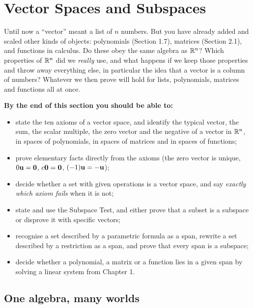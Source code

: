 \documentclass[11pt]{article}
\begin{document}
\section{Vector Spaces and Subspaces}

\begin{guide}
Until now a ``vector'' meant a list of $n$ numbers. But you have already added and scaled other kinds of objects: polynomials (Section 1.7), matrices (Section 2.1), and functions in calculus. Do these obey the same algebra as $\mathbb{R}^n$? Which properties of $\mathbb{R}^n$ did we \emph{really} use, and what happens if we keep those properties and throw away everything else, in particular the idea that a vector is a column of numbers? Whatever we then prove will hold for lists, polynomials, matrices and functions all at once.
\end{guide}

\textbf{By the end of this section you should be able to:}
\begin{itemize}
  \item state the ten axioms of a vector space, and identify the typical vector, the sum, the scalar multiple, the zero vector and the negative of a vector in $\mathbb{R}^n$, in spaces of polynomials, in spaces of matrices and in spaces of functions;
  \item prove elementary facts directly from the axioms (the zero vector is unique, $0\mathbf{u}=\mathbf{0}$, $c\mathbf{0}=\mathbf{0}$, $(-1)\mathbf{u}=-\mathbf{u}$);
  \item decide whether a set with given operations is a vector space, and say \emph{exactly which axiom fails} when it is not;
  \item state and use the Subspace Test, and either prove that a subset is a subspace or disprove it with specific vectors;
  \item recognise a set described by a parametric formula as a span, rewrite a set described by a restriction as a span, and prove that every span is a subspace;
  \item decide whether a polynomial, a matrix or a function lies in a given span by solving a linear system from Chapter 1.
\end{itemize}

\subsection*{One algebra, many worlds}
\end{document}
